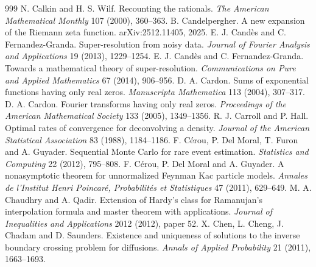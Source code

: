 \begin{thebibliography}{999}
 N. Calkin and H. S. Wilf. Recounting the rationals. \emph{The American Mathematical Monthly} 107 (2000), 360--363.
 B. Candelpergher. A new expansion of the Riemann zeta function. arXiv:2512.11405, 2025.
 E. J. Cand\`es and C. Fernandez-Granda. Super-resolution from noisy data. \emph{Journal of Fourier Analysis and Applications} 19 (2013), 1229--1254.
 E. J. Cand\`es and C. Fernandez-Granda. Towards a mathematical theory of super-resolution. \emph{Communications on Pure and Applied Mathematics} 67 (2014), 906--956.
 D. A. Cardon. Sums of exponential functions having only real zeros. \emph{Manuscripta Mathematica} 113 (2004), 307--317.
 D. A. Cardon. Fourier transforms having only real zeros. \emph{Proceedings of the American Mathematical Society} 133 (2005), 1349--1356.
 R. J. Carroll and P. Hall. Optimal rates of convergence for deconvolving a density. \emph{Journal of the American Statistical Association} 83 (1988), 1184--1186.
 F. C\'erou, P. Del Moral, T. Furon and A. Guyader. Sequential Monte Carlo for rare event estimation. \emph{Statistics and Computing} 22 (2012), 795--808.
 F. C\'erou, P. Del Moral and A. Guyader. A nonasymptotic theorem for unnormalized Feynman Kac particle models. \emph{Annales de l'Institut Henri Poincar\'e, Probabilit\'es et Statistiques} 47 (2011), 629--649.
 M. A. Chaudhry and A. Qadir. Extension of Hardy's class for Ramanujan's interpolation formula and master theorem with applications. \emph{Journal of Inequalities and Applications} 2012 (2012), paper 52.
 X. Chen, L. Cheng, J. Chadam and D. Saunders. Existence and uniqueness of solutions to the inverse boundary crossing problem for diffusions. \emph{Annals of Applied Probability} 21 (2011), 1663--1693.

\end{thebibliography}
